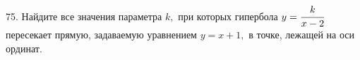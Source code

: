 75. Найдите все значения параметра $k,$ при которых гипербола $y=\cfrac{k}{x-2}$ пересекает прямую, задаваемую уравнением $y=x+1,$ в точке, лежащей на оси ординат.\\
